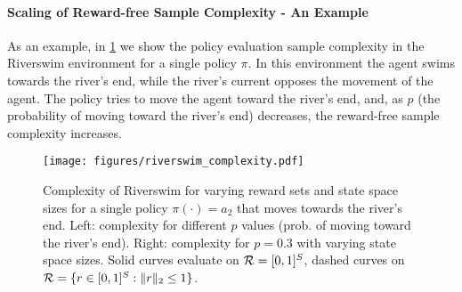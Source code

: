 \paragraph{Scaling of Reward-free Sample Complexity - An Example}
    As an example, in \cref{fig:example-riverswim-complexity} we show the policy evaluation sample complexity in the Riverswim environment \cite{strehl2004empirical} for a single policy $\pi$. In this environment the agent swims towards the river's end, while the river's current opposes the movement of the agent. The policy tries to move the agent toward the river's end, and, as $p$ (the probability of moving toward the river's end) decreases, the reward-free sample complexity increases.

 \begin{figure}[t]
    \centering
\texttt{[image: figures/riverswim\_complexity.pdf]}
    \caption{Complexity of Riverswim  for varying reward sets and state space sizes for a single policy $\pi(\cdot)=a_2$ that moves towards the river's end. Left: complexity for different $p$ values (prob. of moving toward the river's end). Right: complexity for $p=0.3$ with varying state space sizes. Solid curves evaluate on ${\cal R}=[0,1]^S$, dashed curves on ${\cal R}=\{r\in [0,1]^S:\|r\|_2\leq 1\}$. }
    \label{fig:example-riverswim-complexity}
\end{figure}
